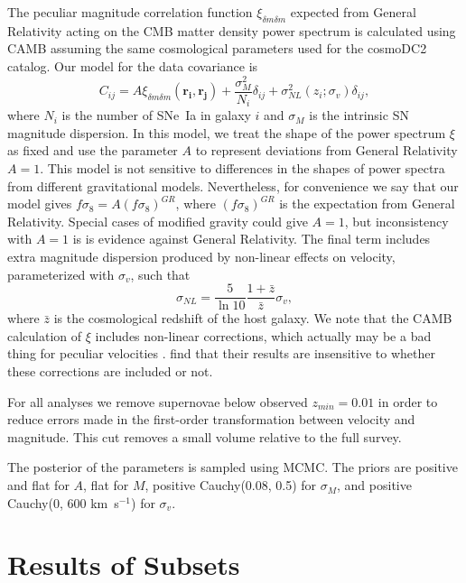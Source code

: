 \documentclass{aastex62}   	%
\begin{document}
The peculiar magnitude correlation
function $\xi_{\delta m \delta m}$ expected from General Relativity acting on the CMB
matter density power spectrum is calculated using CAMB \citep{Lewis:2002ah}  assuming the same
cosmological parameters used for the cosmoDC2 catalog.  Our model for the data covariance
is
\begin{equation}
C_{ij} = A\xi_{\delta m \delta m}(\mathbf{r_i},\mathbf{r_j}) + \frac{\sigma_M^2}{N_i} \delta_{ij} + \sigma^2_{NL}(z_i;\sigma_{v})\delta_{ij},
\end{equation}
where $N_i$ is the number of SNe~Ia in galaxy $i$ and $\sigma_M$ is the intrinsic SN magnitude dispersion.
In this model, we treat the shape of the power spectrum $\xi$ as fixed and use the parameter $A$ to represent
deviations from General Relativity $A=1$.  This model is not sensitive to differences in the shapes
of  power spectra from different gravitational models.  Nevertheless, for
convenience we say that our model gives $f\sigma_8 = A (f\sigma_8)^{GR}$, where $(f\sigma_8)^{GR}$ is the expectation
from General Relativity.  Special cases of modified gravity could give $A=1$, but inconsistency with $A=1$ is is evidence against General Relativity.
The final term includes extra magnitude dispersion produced by non-linear effects on velocity, parameterized with $\sigma_{v}$, such that
\begin{equation}
\sigma_{NL} = \frac{5}{\ln{10}} \frac{1+\bar{z}}{\bar{z}} \sigma_v,
\end{equation}
where $\bar{z}$ is the cosmological redshift of the host galaxy.
We note that the CAMB calculation of $\xi$ includes non-linear corrections, which actually may be a bad thing for peculiar velocities \citep{2015MNRAS.454.3920H}. 
\citet{2015JCAP...12..033H} find that their results are insensitive to whether these corrections are included or not.

For all analyses we remove supernovae below observed $z_{min}=0.01$ in order to
reduce errors made in the first-order transformation between velocity and
magnitude.  This cut removes a  small volume relative to the full survey.

The posterior of the parameters is sampled using MCMC.
The priors are positive and flat for $A$, flat for $M$, positive Cauchy(0.08, 0.5) for $\sigma_M$, and  positive Cauchy(0, 600 km~s$^{-1}$) for $\sigma_{v}$.


\section{Results of Subsets}
\end{document}
